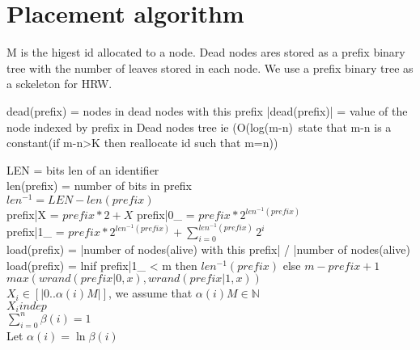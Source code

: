 \section{Placement algorithm}
M is the higest id allocated to a node.
Dead nodes ares stored as a prefix binary tree with the number of leaves stored in each node.
We use a prefix binary tree as a sckeleton for HRW.

dead(prefix) = {nodes in dead nodes with this prefix}
|dead(prefix)| = value of the node indexed by prefix in Dead nodes tree ie (O(log(m-n)~state that m-n is a constant(if m-n>K then reallocate id such that m=n))

LEN = bits len of an identifier\\
len(prefix) = number of bits in prefix\\
$len^{-1} = LEN-len(prefix)$ \\
prefix|X = $prefix * 2 + X$
prefix|0\_ = $prefix * 2^{len^{-1}(prefix)}$\\
prefix|1\_ = $prefix * 2^{len^{-1}(prefix)} + \sum_{i=0}^{len^{-1}(prefix)}{2^i}$\\
load(prefix) = |{number of nodes(alive) with this prefix}| / |{number of nodes(alive)}\\
load(prefix) =  ln{if prefix|1\_ < m then $len^{-1}(prefix)$ else $m-prefix+1$}\\

$max(wrand(prefix|0,x),wrand(prefix|1,x))$\\
$X_i \in [|0..\alpha(i) M|]$, we assume that $\alpha(i) M \in \mathbb{N}$\\
$X_i indep$\\

$\sum_{i=0}^{n}{\beta(i)} = 1$\\
Let $\alpha(i) = \ln{\beta(i)}$\\

